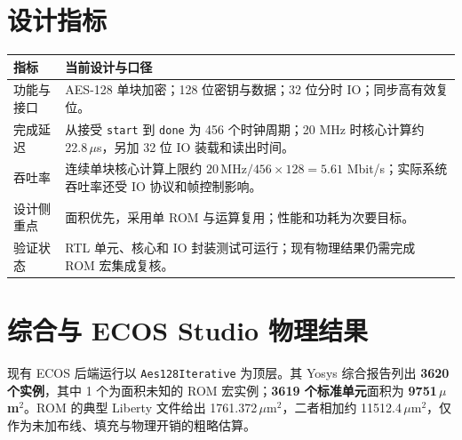 \documentclass[10pt,a4paper]{ctexart}
\begin{document}
\section{设计指标}
\begin{center}\small
\begin{tabularx}{\linewidth}{>{\raggedright\arraybackslash}p{35mm}X}
\toprule 指标 & 当前设计与口径 \\ \midrule
功能与接口 & AES-128 单块加密；128 位密钥与数据；32 位分时 IO；同步高有效复位。\\
完成延迟 & 从接受 \texttt{start} 到 \texttt{done} 为 456 个时钟周期；20 MHz 时核心计算约 22.8\,$\mu$s，另加 32 位 IO 装载和读出时间。\\
吞吐率 & 连续单块核心计算上限约 $20\,\mathrm{MHz}/456\times128=5.61$ Mbit/s；实际系统吞吐率还受 IO 协议和帧控制影响。\\
设计侧重点 & 面积优先，采用单 ROM 与运算复用；性能和功耗为次要目标。\\
验证状态 & RTL 单元、核心和 IO 封装测试可运行；现有物理结果仍需完成 ROM 宏集成复核。\\
\bottomrule
\end{tabularx}
\end{center}
\section{综合与 ECOS Studio 物理结果}
现有 ECOS 后端运行以 \texttt{Aes128Iterative} 为顶层。其 Yosys 综合报告列出 \textbf{3620 个实例}，其中 1 个为面积未知的 ROM 宏实例；\textbf{3619 个标准单元}面积为 \textbf{9751\,$\mu$m$^2$}。ROM 的典型 Liberty 文件给出 1761.372\,$\mu$m$^2$，二者相加约 11512.4\,$\mu$m$^2$，仅作为未加布线、填充与物理开销的粗略估算。
\end{document}
